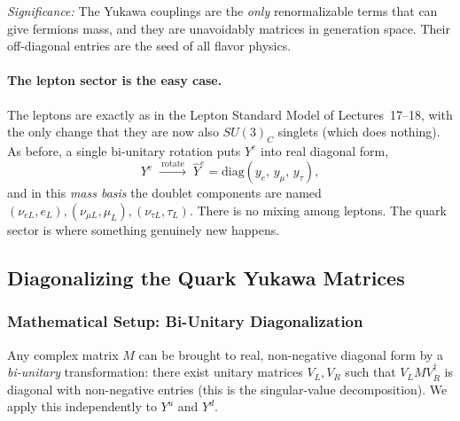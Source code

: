 \textit{Significance:} The Yukawa couplings are the \emph{only}
renormalizable terms that can give fermions mass, and they are
unavoidably matrices in generation space. Their off-diagonal entries
are the seed of all flavor physics.


\paragraph{The lepton sector is the easy case.}
The leptons are exactly as in the Lepton Standard Model of
Lectures~17--18, with the only change that they are now also $SU(3)_C$
singlets (which does nothing). As before, a single bi-unitary rotation
puts $Y^e$ into real diagonal form,
\begin{equation}
  Y^e \;\xrightarrow{\ \text{rotate}\ }\;
  \hat Y^e = \mathrm{diag}(y_e,\,y_\mu,\,y_\tau),
  \label{eq:lec20:ye-diag}
\end{equation}
and in this \emph{mass basis} the doublet components are named
$(\nu_{eL},e_L),(\nu_{\mu L},\mu_L),(\nu_{\tau L},\tau_L)$. There is no
mixing among leptons. The quark sector is where something genuinely new
happens.

\subsection{Diagonalizing the Quark Yukawa Matrices}\label{subsec:lec20:ckm}

\subsubsection*{Mathematical Setup: Bi-Unitary Diagonalization}

Any complex matrix $M$ can be brought to real, non-negative diagonal
form by a \emph{bi-unitary} transformation: there exist unitary
matrices $V_L, V_R$ such that $V_L M V_R^\dagger$ is diagonal with
non-negative entries (this is the singular-value decomposition). We
apply this independently to $Y^u$ and $Y^d$.

